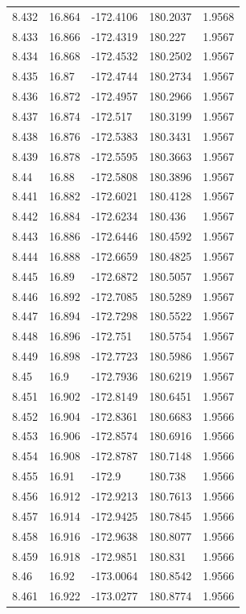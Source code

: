 \begin{tabular}{lllll}
8.432 & 16.864 & -172.4106 & 180.2037 & 1.9568 \\
8.433 & 16.866 & -172.4319 & 180.227 & 1.9567 \\
8.434 & 16.868 & -172.4532 & 180.2502 & 1.9567 \\
8.435 & 16.87 & -172.4744 & 180.2734 & 1.9567 \\
8.436 & 16.872 & -172.4957 & 180.2966 & 1.9567 \\
8.437 & 16.874 & -172.517 & 180.3199 & 1.9567 \\
8.438 & 16.876 & -172.5383 & 180.3431 & 1.9567 \\
8.439 & 16.878 & -172.5595 & 180.3663 & 1.9567 \\
8.44 & 16.88 & -172.5808 & 180.3896 & 1.9567 \\
8.441 & 16.882 & -172.6021 & 180.4128 & 1.9567 \\
8.442 & 16.884 & -172.6234 & 180.436 & 1.9567 \\
8.443 & 16.886 & -172.6446 & 180.4592 & 1.9567 \\
8.444 & 16.888 & -172.6659 & 180.4825 & 1.9567 \\
8.445 & 16.89 & -172.6872 & 180.5057 & 1.9567 \\
8.446 & 16.892 & -172.7085 & 180.5289 & 1.9567 \\
8.447 & 16.894 & -172.7298 & 180.5522 & 1.9567 \\
8.448 & 16.896 & -172.751 & 180.5754 & 1.9567 \\
8.449 & 16.898 & -172.7723 & 180.5986 & 1.9567 \\
8.45 & 16.9 & -172.7936 & 180.6219 & 1.9567 \\
8.451 & 16.902 & -172.8149 & 180.6451 & 1.9567 \\
8.452 & 16.904 & -172.8361 & 180.6683 & 1.9566 \\
8.453 & 16.906 & -172.8574 & 180.6916 & 1.9566 \\
8.454 & 16.908 & -172.8787 & 180.7148 & 1.9566 \\
8.455 & 16.91 & -172.9 & 180.738 & 1.9566 \\
8.456 & 16.912 & -172.9213 & 180.7613 & 1.9566 \\
8.457 & 16.914 & -172.9425 & 180.7845 & 1.9566 \\
8.458 & 16.916 & -172.9638 & 180.8077 & 1.9566 \\
8.459 & 16.918 & -172.9851 & 180.831 & 1.9566 \\
8.46 & 16.92 & -173.0064 & 180.8542 & 1.9566 \\
8.461 & 16.922 & -173.0277 & 180.8774 & 1.9566 \\

\end{tabular}
